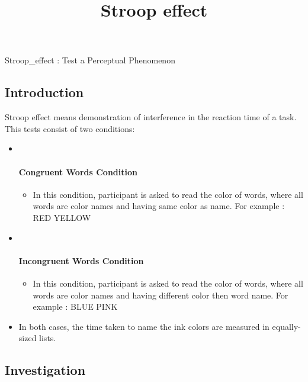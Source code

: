 \documentclass[11pt]{article}
\title{Stroop effect}
\providecommand{\tightlist}{%
      \setlength{\itemsep}{0pt}\setlength{\parskip}{0pt}}
\begin{document}
    
    
    \maketitle
    
    

    
    Stroop\_effect : Test a Perceptual Phenomenon

    \subsection{Introduction}\label{introduction}

    Stroop effect means demonstration of interference in the reaction time
of a task. This tests consist of two conditions:

    \begin{itemize}
\item ~
  \paragraph{Congruent Words Condition}\label{congruent-words-condition}

  \begin{itemize}
  \tightlist
  \item
    In this condition, participant is asked to read the color of words,
    where all words are color names and having same color as name. For
    example : RED YELLOW
  \end{itemize}
\item ~
  \paragraph{Incongruent Words
  Condition}\label{incongruent-words-condition}

  \begin{itemize}
  \tightlist
  \item
    In this condition, participant is asked to read the color of words,
    where all words are color names and having different color then word
    name. For example : BLUE PINK
  \end{itemize}
\item
  In both cases, the time taken to name the ink colors are measured in
  equally-sized lists.
\end{itemize}

    \subsection{Investigation}\label{investigation}
\end{document}
